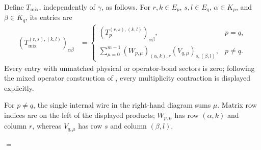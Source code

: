 \begin{definition}
    \label{def:mpo_mixed_action_tensor}
    \leanok
    Define $T_{\mathrm{mix}}$, independently of $\gamma$, as follows.
    For $r,k\in E_p$, $s,l\in E_q$, $\alpha\in K_p$, and
    $\beta\in K_q$, its entries are
    \begin{align}
        (T_{\mathrm{mix}}^{(r,s),(k,l)})_{\alpha\beta}
         & =\begin{cases}
                (T_p^{(r,s),(k,l)})_{\alpha\beta}, & p=q,    \\
                \displaystyle\sum_{\mu=0}^{m-1}
                (W_{p,\mu})_{(\alpha,k),r}
                (V_{q,\mu})_{s,(\beta,l)},         & p\ne q.
            \end{cases}
        \label{eq:mpo_mix_action_cross}
    \end{align}
    Every entry with unmatched physical or operator-bond sectors is
    zero; following the mixed operator construction of
    \cite[Section~5]{GarreRubio2023MPOSym}, every multiplicity
    contraction is displayed explicitly.
\end{definition}

For $p\ne q$, the single internal wire in the right-hand diagram sums
$\mu$. Matrix row indices are on the left of the displayed products;
$W_{p,\mu}$ has row $(\alpha,k)$ and column $r$, whereas
$V_{q,\mu}$ has row $s$ and column $(\beta,l)$.
\tenkzkernel
\begin{tenkzequation}
    \begin{tenkz}[rows={wire}, cols=2, bonds=none]
    \end{tenkz}
    $=$
    \begin{tenkz}[rows={wire}, cols=2, bonds=none]
    \end{tenkz}
\end{tenkzequation}


